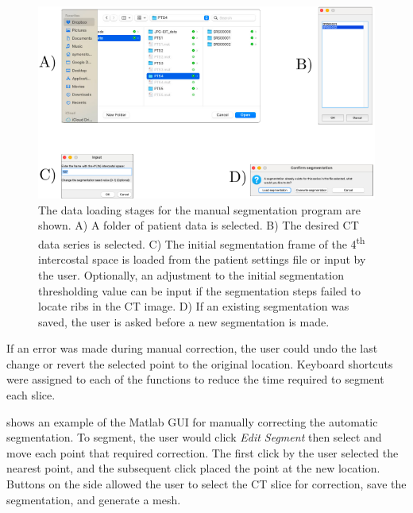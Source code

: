 \begin{figure}
	\centering
	\includegraphics[width=\textwidth]{chapter5-CT_to_mesh/imgs/SegmentationAppSetup.pdf}
	\caption[Manual segmentation data loading]{\label{fig:seg_load}%
	The data loading stages for the manual segmentation program are shown.
	A) A folder of patient data is selected. B) The desired CT data series is selected.
	C) The initial segmentation frame of the 4\textsuperscript{th} intercostal space 
	is loaded from the patient settings file or input by the user. Optionally, an 
	adjustment to the initial segmentation thresholding value can be input if the 
	segmentation steps failed to locate ribs in the CT image. D) If an existing
	segmentation was saved, the user is asked before a new segmentation 
	is made.
	}
\end{figure}

If an error was made during manual correction, the user could undo
the last change or revert the selected point to the original location. 
Keyboard shortcuts were assigned to each of the functions to reduce the time required
to segment each slice.

 shows an example of the Matlab GUI for manually correcting
the automatic segmentation. To segment, the user would click \emph{Edit Segment} 
then select and move each point that required correction. The first click by the user
selected the nearest point, and the subsequent click placed the point at the new location. 
Buttons on the side allowed the user to 
select the CT slice for correction, save the segmentation, and generate a mesh. 

